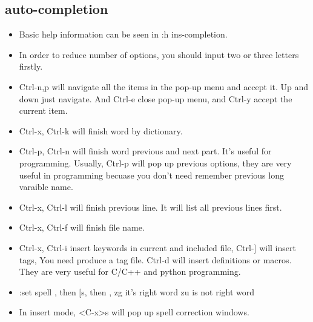 \documentclass[a4paper,12pt,twoside]{book}
\begin{document}
\subsection{auto-completion}
\begin{itemize}
		\item Basic help information can be seen in :h ins-completion. 

		\item In order to reduce number of options, you should input two or three letters firstly.

		\item Ctrl-n,p will navigate all the items in the pop-up menu and accept it. Up and down just navigate. And Ctrl-e close pop-up menu, and Ctrl-y accept the current item. 

		\item Ctrl-x, Ctrl-k will finish word by dictionary. 

		\item Ctrl-p, Ctrl-n will finish word previous and next part. It's useful for programming. Usually, Ctrl-p will pop up previous options, they are very useful in programming becuase you don't need remember previous long varaible name. 

		\item Ctrl-x, Ctrl-l will finish previous line. It will list all previous lines first. 

		\item Ctrl-x, Ctrl-f will finish file name. 

		\item Ctrl-x, Ctrl-i insert keywords in current and included file,  Ctrl-] will insert tags, You need produce a tag file. Ctrl-d will insert definitions or macros. They are very useful for C/C++ and python programming.

		\item :set spell , then $[$s, then , zg it's right word zu is not right word

		\item In insert mode, <C-x>s will pop up spell correction windows. 
\end{itemize}
\end{document}
